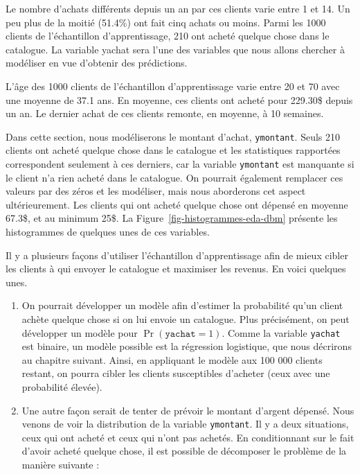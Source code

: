 \documentclass[
  11pt,
  letterpaper,
]{scrbook}
\providecommand{\tightlist}{%
  \setlength{\itemsep}{0pt}\setlength{\parskip}{0pt}}\usepackage{longtable,booktabs,array}
\theoremstyle{definition}
\theoremstyle{remark}
\begin{document}
Le nombre d'achats différents depuis un an par ces clients varie entre 1
et 14. Un peu plus de la moitié (51.4\%) ont fait cinq achats ou moins.
Parmi les 1000 clients de l'échantillon d'apprentissage, 210 ont acheté
quelque chose dans le catalogue. La variable yachat sera l'une des
variables que nous allons chercher à modéliser en vue d'obtenir des
prédictions.

L'âge des 1000 clients de l'échantillon d'apprentissage varie entre 20
et 70 avec une moyenne de 37.1 ans. En moyenne, ces clients ont acheté
pour 229.30\$ depuis un an. Le dernier achat de ces clients remonte, en
moyenne, à 10 semaines.

Dans cette section, nous modéliserons le montant d'achat,
\texttt{ymontant}. Seuls 210 clients ont acheté quelque chose dans le
catalogue et les statistiques rapportées correspondent seulement à ces
derniers, car la variable \texttt{ymontant} est manquante si le client
n'a rien acheté dans le catalogue. On pourrait également remplacer ces
valeurs par des zéros et les modéliser, mais nous aborderons cet aspect
ultérieurement. Les clients qui ont acheté quelque chose ont dépensé en
moyenne 67.3\$, et au minimum 25\$. La
Figure~\ref{fig-histogrammes-eda-dbm} présente les histogrammes de
quelques unes de ces variables.

Il y a plusieurs façons d'utiliser l'échantillon d'apprentissage afin de
mieux cibler les clients à qui envoyer le catalogue et maximiser les
revenus. En voici quelques unes.

\begin{enumerate}
\def\labelenumi{\alph{enumi})}
\tightlist
\item
  On pourrait développer un modèle afin d'estimer la probabilité qu'un
  client achète quelque chose si on lui envoie un catalogue. Plus
  précisément, on peut développer un modèle pour
  \(\Pr(\texttt{yachat}=1)\). Comme la variable \texttt{yachat} est
  binaire, un modèle possible est la régression logistique, que nous
  décrirons au chapitre suivant. Ainsi, en appliquant le modèle aux 100
  000 clients restant, on pourra cibler les clients susceptibles
  d'acheter (ceux avec une probabilité élevée).
\item
  Une autre façon serait de tenter de prévoir le montant d'argent
  dépensé. Nous venons de voir la distribution de la variable
  \texttt{ymontant}. Il y a deux situations, ceux qui ont acheté et ceux
  qui n'ont pas achetés. En conditionnant sur le fait d'avoir acheté
  quelque chose, il est possible de décomposer le problème de la manière
  suivante :
\end{enumerate}
\end{document}
